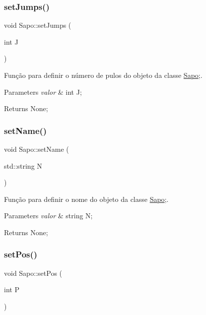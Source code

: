 \subsubsection{\texorpdfstring{set\+Jumps()}{setJumps()}}
{\footnotesize\ttfamily void Sapo\+::set\+Jumps (\begin{DoxyParamCaption}\item[{int}]{J }\end{DoxyParamCaption})}



Função para definir o número de pulos do objeto da classe \mbox{\hyperlink{class_sapo}{Sapo}};. 


\begin{DoxyParams}{Parameters}
{\em valor} & int J; \\
\hline
\end{DoxyParams}
\begin{DoxyReturn}{Returns}
None; 
\end{DoxyReturn}
\mbox{\label{class_sapo_a1e83bf88e977ea3271afece7751b7221}} 
\subsubsection{\texorpdfstring{set\+Name()}{setName()}}
{\footnotesize\ttfamily void Sapo\+::set\+Name (\begin{DoxyParamCaption}\item[{std\+::string}]{N }\end{DoxyParamCaption})}



Função para definir o nome do objeto da classe \mbox{\hyperlink{class_sapo}{Sapo}};. 


\begin{DoxyParams}{Parameters}
{\em valor} & string N; \\
\hline
\end{DoxyParams}
\begin{DoxyReturn}{Returns}
None; 
\end{DoxyReturn}
\mbox{\label{class_sapo_a3be8291d7fa538aa52e6c6a133986845}} 
\subsubsection{\texorpdfstring{set\+Pos()}{setPos()}}
{\footnotesize\ttfamily void Sapo\+::set\+Pos (\begin{DoxyParamCaption}\item[{int}]{P }\end{DoxyParamCaption})}




